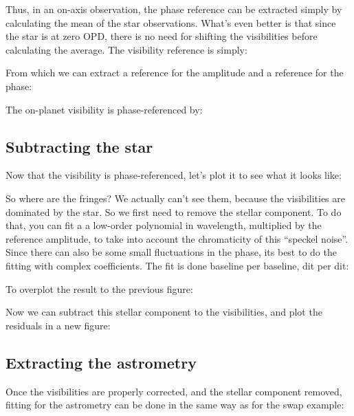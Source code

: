 Thus, in an on-axis observation, the phase reference can be extracted simply by calculating the mean of the star observations. What's even better is that since the star is at zero OPD, there is no need for shifting the visibilities before calculating the average. The visibility reference is simply:


\noindent{}From which we can extract a reference for the amplitude and a reference for the phase:


\noindent{}The on-planet visibility is phase-referenced by:



\subsection{Subtracting the star}

Now that the visibility is phase-referenced, let's plot it to see what it looks like:


\noindent{}So where are the fringes? We actually can't see them, because the visibilities are dominated by the star. So we first need to remove the stellar component. To do that, you can fit a a low-order polynomial in wavelength, multiplied by the reference amplitude, to take into account the chromaticity of this ``speckel noise''.  Since there can also be some small fluctuations in the phase, its best to do the fitting with complex coefficients. The fit is done baseline per baseline, dit per dit:


\noindent{}To overplot the result to the previous figure:


\noindent{}Now we can subtract this stellar component to the visibilities, and plot the residuals in a new figure:




\subsection{Extracting the astrometry}

Once the visibilities are properly corrected, and the stellar component removed, fitting for the astrometry can be done in the same way as for the swap example:


